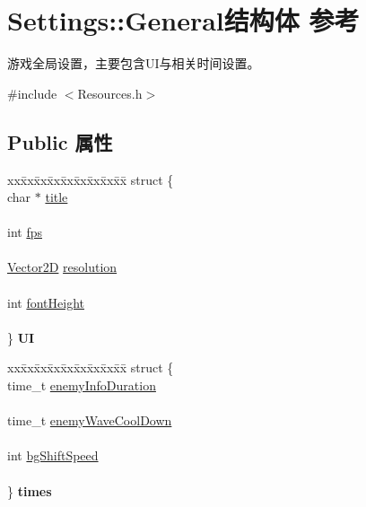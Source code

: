 \hypertarget{struct_settings_1_1_general}{}\section{Settings\+:\+:General结构体 参考}
\label{struct_settings_1_1_general}


游戏全局设置，主要包含\+U\+I与相关时间设置。  




{\ttfamily \#include $<$Resources.\+h$>$}

\subsection*{Public 属性}
\begin{DoxyCompactItemize}
\item 
\mbox{\label{struct_settings_1_1_general_a414f100b330453215b514ec726a9fac9}} 
\begin{tabbing}
xx\=xx\=xx\=xx\=xx\=xx\=xx\=xx\=xx\=\kill
struct \{\\
\>char $\ast$ \hyperlink{struct_settings_1_1_general_acb5598e7641429cde268ecd8f80c4da0}{title}\\
\>\\
\>int \hyperlink{struct_settings_1_1_general_a5ebbaffe3220c3daf7ef79c4cd7f1ad6}{fps}\\
\>\\
\>\hyperlink{structbasic__vector2_d}{Vector2D} \hyperlink{struct_settings_1_1_general_a4cdcf50e69a10db0e410db97bd547d38}{resolution}\\
\>\\
\>int \hyperlink{struct_settings_1_1_general_ad459481ace3b01e1d80a7548325d28d2}{fontHeight}\\
\>\\
\} {\bfseries UI}\\

\end{tabbing}\item 
\mbox{\label{struct_settings_1_1_general_ae31b262693f15e6ab5ea1e1c609249b9}} 
\begin{tabbing}
xx\=xx\=xx\=xx\=xx\=xx\=xx\=xx\=xx\=\kill
struct \{\\
\>time\_t \hyperlink{struct_settings_1_1_general_a4665f9d9617ebd906abbf70828c4f4f5}{enemyInfoDuration}\\
\>\\
\>time\_t \hyperlink{struct_settings_1_1_general_a5888b0e6d233eb4388c70b7c223552e5}{enemyWaveCoolDown}\\
\>\\
\>int \hyperlink{struct_settings_1_1_general_ae17ce428cf02b7c52530c8752ebca9cd}{bgShiftSpeed}\\
\>\\
\} {\bfseries times}\\


\end{tabbing}
\end{DoxyCompactItemize}
